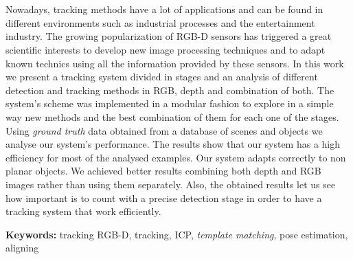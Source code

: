 \chapter*{\runtitle}


\noindent Nowadays, tracking methods have a lot of applications and can be found in different environments such as industrial processes and the entertainment industry. The growing popularization of RGB-D sensors has triggered a great scientific interests to develop new image processing techniques and to adapt known technics using all the information provided by these sensors. In this work we present a tracking system divided in stages and an analysis of different detection and tracking methods in RGB, depth and combination of both. The system's scheme was implemented in a modular fashion to explore in a simple way new methods and the best combination of them for each one of the stages. Using \textit{ground truth} data obtained from a database of scenes and objects we analyse our system's performance. The results show that our system has a high efficiency for most of the analysed examples. Our system adapts correctly to non planar objects. We achieved better results combining both depth and RGB images rather than using them separately. Also, the obtained results let us see how important is to count with a precise detection stage in order to have a tracking system that work efficiently.


\bigskip

\noindent\textbf{Keywords:} tracking RGB-D, tracking, ICP, \textit{template matching}, pose estimation, aligning



